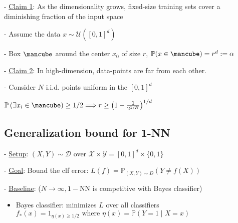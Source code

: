 - \underline{{Claim} 1}: As the dimensionality grows, fixed-size training sets cover a diminishing fraction of the input space

- Assume the data $x \sim \mathcal{U}\left([0,1]^{d}\right)$

- Box $\mbox{\mancube}$ around the center $x_{0}$ of size $r$, 
$
\mathbb{P}(x \in \mbox{\mancube})=r^{d}:=\alpha
$




- \underline{{Claim} 2}: In high-dimension, data-points are far from each other.

- Consider $N$ i.i.d. points uniform in the $[0,1]^{d}$

$
\mathbb{P}\left(\exists x_{i} \in \mbox{\mancube}\right) \geq 1 / 2 \Longrightarrow r \geq\left(1-\frac{1}{2^{1 / N}}\right)^{1 / d}
$





\subsection*{Generalization bound for 1-NN}
- \underline{Setup}: $(X, Y) \sim \mathscr{D}$ over $\mathscr{X} \times \mathscr{Y}=[0,1]^{d} \times\{0,1\}$

- \underline{Goal}: Bound the clf error:
$
L(f)=\mathbb{P}_{(X, Y) \sim D}(Y \neq f(X))
$

- \underline{Baseline}: ($N \rightarrow \infty, 1-\mathrm{NN}$ is competitive with Bayes classifier)
\begin{itemize}
  \item Bayes classifier: minimizes $L$ over all classifiers
  $
  f_{*}(x)=1_{\eta(x) \geq 1 / 2} \text { where } \eta(x)=\mathbb{P}(Y=1 \mid X=x)
  $
\end{itemize}


